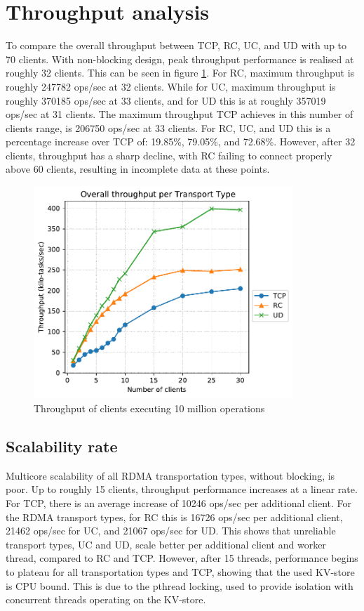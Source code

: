 \section{Throughput analysis}\label{sec:throughput-analysis}
To compare the overall throughput between TCP, RC, UC, and UD with up to 70 clients.
With non-blocking design, peak throughput performance is realised at roughly 32 clients.
This can be seen in figure \ref{fig:throughput-30}.
For RC, maximum throughput is roughly 247782 ops/sec at 32 clients.
While for UC, maximum throughput is roughly 370185 ops/sec at 33 clients, and for UD this is at roughly 357019 ops/sec at 31 clients.
The maximum throughput TCP achieves in this number of clients range, is 206750 ops/sec at 33 clients.
For RC, UC, and UD this is a percentage increase over TCP of: 19.85\%, 79.05\%, and 72.68\%.
However, after 32 clients, throughput has a sharp decline, with RC failing to connect properly above 60 clients, resulting in incomplete data at these points.
\begin{figure}
    \centering
    \includegraphics[height=8cm]{figures/PDF/Throughput_30}
    \caption{Throughput of clients executing 10 million operations}
    \label{fig:throughput-30}
\end{figure}

\subsection{Scalability rate}\label{subsec:scalability-rate}
Multicore scalability of all RDMA transportation types, without blocking, is poor.
Up to roughly 15 clients, throughput performance increases at a linear rate.
For TCP, there is an average increase of 10246 ops/sec per additional client.
For the RDMA transport types, for RC this is 16726 ops/sec per additional client, 21462 ops/sec for UC, and 21067 ops/sec for UD.
This shows that unreliable transport types, UC and UD, scale better per additional client and worker thread, compared to RC and TCP.
However, after 15 threads, performance begins to plateau for all transportation types and TCP, showing that the used KV-store is CPU bound.
This is due to the pthread locking, used to provide isolation with concurrent threads operating on the KV-store.

